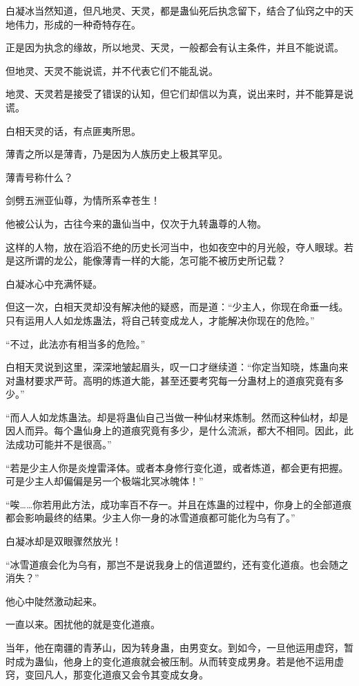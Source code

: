 
\begin{this_body}

白凝冰当然知道，但凡地灵、天灵，都是蛊仙死后执念留下，结合了仙窍之中的天地伟力，形成的一种奇特存在。

正是因为执念的缘故，所以地灵、天灵，一般都会有认主条件，并且不能说谎。

但地灵、天灵不能说谎，并不代表它们不能乱说。

地灵、天灵若是接受了错误的认知，但它们却信以为真，说出来时，并不能算是说谎。

白相天灵的话，有点匪夷所思。

薄青之所以是薄青，乃是因为人族历史上极其罕见。

薄青号称什么？

剑劈五洲亚仙尊，为情所系幸苍生！

他被公认为，古往今来的蛊仙当中，仅次于九转蛊尊的人物。

这样的人物，放在滔滔不绝的历史长河当中，也如夜空中的月光般，夺人眼球。若是这所谓的龙公，能像薄青一样的大能，怎可能不被历史所记载？

白凝冰心中充满怀疑。

但这一次，白相天灵却没有解决他的疑惑，而是道：“少主人，你现在命垂一线。只有运用人人如龙炼蛊法，将自己转变成龙人，才能解决你现在的危险。”

“不过，此法亦有相当多的危险。”

白相天灵说到这里，深深地皱起眉头，叹一口才继续道：“你定当知晓，炼蛊向来对蛊材要求严苛。高明的炼道大能，甚至还要考究每一分蛊材上的道痕究竟有多少。”

“而人人如龙炼蛊法。却是将蛊仙自己当做一种仙材来炼制。然而这种仙材，却是因人而异。每个蛊仙身上的道痕究竟有多少，是什么流派，都大不相同。因此，此法成功可能并不是很高。”

“若是少主人你是炎煌雷泽体。或者本身修行变化道，或者炼道，都会更有把握。可是少主人却偏偏是另一个极端北冥冰魄体！”

“唉……你若用此方法，成功率百不存一。并且在炼蛊的过程中，你身上的全部道痕都会影响最终的结果。少主人你一身的冰雪道痕都可能化为乌有了。”

白凝冰却是双眼骤然放光！

“冰雪道痕会化为乌有，那岂不是说我身上的信道盟约，还有变化道痕。也会随之消失？”

他心中陡然激动起来。

一直以来。困扰他的就是变化道痕。

当年，他在南疆的青茅山，因为转身蛊，由男变女。到如今，一旦他运用虚窍，暂时成为蛊仙，他身上的变化道痕就会被压制。从而转变成男身。若是他不运用虚窍，变回凡人，那变化道痕又会令其变成女身。


\end{this_body}
